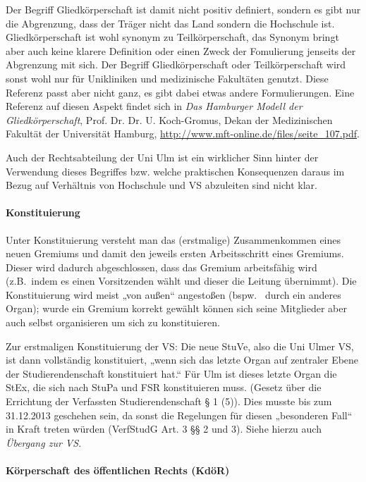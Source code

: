 \documentclass[
10pt,
a4paper,
twoside,								%
titlepage=false,							%
draft=false								%
]{scrartcl}
\begin{document}
Der Begriff Gliedkörperschaft ist damit nicht positiv definiert, sondern es gibt nur die Abgrenzung, dass der Träger nicht das Land sondern die Hochschule ist. Gliedkörperschaft ist wohl synonym zu Teilkörperschaft, das Synonym bringt aber auch keine klarere Definition oder einen Zweck der Fomulierung jenseits der Abgrenzung mit sich. Der Begriff Gliedkörperschaft oder Teilkörperschaft wird sonst wohl nur für Unikliniken und medizinische Fakultäten genutzt. Diese Referenz passt aber nicht ganz, es gibt dabei etwas andere Formulierungen. Eine Referenz auf diesen Aspekt findet sich in \emph{Das Hamburger Modell der Gliedkörperschaft}, Prof. Dr. Dr. U. Koch-Gromus, Dekan der Medizinischen Fakultät der Universität Hamburg, \url{http://www.mft-online.de/files/seite_107.pdf}.

Auch der Rechtsabteilung der Uni Ulm ist ein wirklicher Sinn hinter der Verwendung dieses Begriffes bzw. welche praktischen Konsequenzen daraus im Bezug auf Verhältnis von Hochschule und VS abzuleiten sind nicht klar.



\paragraph{Konstituierung}

Unter Konstituierung versteht man das (erstmalige) Zusammenkommen eines neuen Gremiums und damit den jeweils ersten Arbeitsschritt eines Gremiums. Dieser wird dadurch abgeschlossen, dass das Gremium arbeitsfähig wird (z.B.~indem es einen Vorsitzenden wählt und dieser die Leitung übernimmt). Die Konstituierung wird meist „von außen“ angestoßen (bspw.~ durch ein anderes Organ); wurde ein Gremium korrekt gewählt können sich seine Mitglieder aber auch selbst organisieren um sich zu konstituieren.

Zur erstmaligen Konstituierung der VS: Die neue StuVe, also die Uni Ulmer VS, ist dann vollständig konstituiert, „wenn sich das letzte Organ auf zentraler Ebene der Studierendenschaft konstituiert hat.“ Für Ulm ist dieses letzte Organ die StEx, die sich nach StuPa und FSR konstituieren muss. (Gesetz über die Errichtung der Verfassten Studierendenschaft § 1 (5)). Dies musste bis zum 31.12.2013 geschehen sein, da sonst die Regelungen für diesen „besonderen Fall“ in Kraft treten würden (VerfStudG Art. 3 §§ 2 und 3). Siehe hierzu auch \emph{Übergang zur VS}.



\paragraph{Körperschaft des öffentlichen Rechts (KdöR)}
\end{document}
